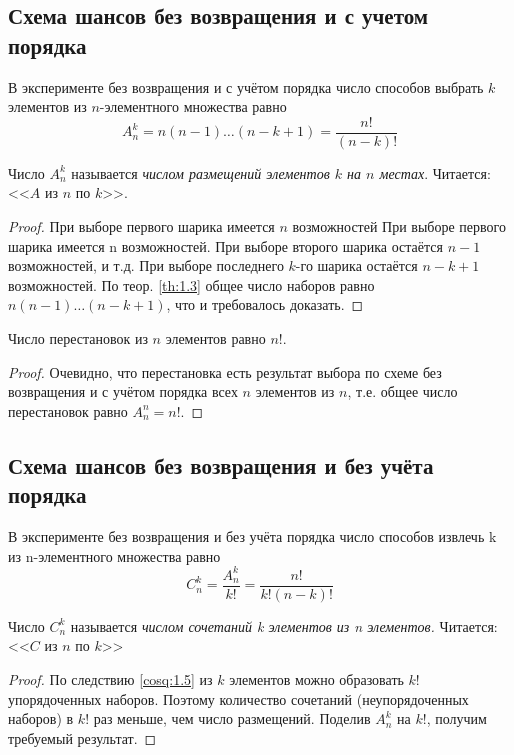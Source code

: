 \subsection{Схема шансов без возвращения и с учетом порядка}
\begin{theorem}
\label{th:1.4}
В эксперименте без возвращения и с учётом порядка число способов выбрать $k$ элементов из $n$-элементного множества равно
\begin{equation*}
	A_n^k=n(n-1)\dots(n-k+1)=\frac{n!}{(n-k)!}
\end{equation*}
\end{theorem}
Число $A_n^k$ называется \textit{числом размещений элементов $k$ на $n$ местах}. Читается: <<$A$ из $n$ по $k$>>.  

\begin{proof}
При выборе первого шарика имеется $n$ возможностей При выборе первого шарика имеется n возможностей. При выборе второго шарика остаётся $n−1$ возможностей, и т.д. При выборе последнего $k$-го шарика остаётся $n − k + 1$ возможностей. По теор. \ref{th:1.3} общее
число наборов равно $n(n−1)\dots(n−k +1)$, что и требовалось доказать.
\end{proof}

\begin{consq}
\label{cosq:1.5}
Число перестановок из $n$ элементов равно $n!$.
\end{consq}

\begin{proof}
Очевидно, что перестановка есть результат выбора по схеме без возвращения и с учётом порядка всех $n$ элементов из $n$, т.е. общее
число перестановок равно $A_n^n=n!$.
\end{proof}
\subsection{Схема шансов без возвращения и без учёта порядка}
\begin{theorem}
\label{th:1.6}
В эксперименте без возвращения и без учёта порядка число
способов извлечь k из n-элементного множества равно
\begin{equation*}
	C_n^k=\frac{A_n^k}{k!}=\frac{n!}{k!(n-k)!}
\end{equation*}
	
Число $C_n^k$ называется \textit{числом сочетаний k элементов из n элементов.}
Читается: <<$C$ из $n$ по $k$>>
\end{theorem}

\begin{proof}
По следствию \ref{cosq:1.5} из $k$ элементов можно образовать $k!$ упорядоченных наборов. Поэтому количество сочетаний 
(неупорядоченных наборов)
в $k!$ раз меньше, чем число размещений. Поделив $A^k_n$ на $k!$, получим требуемый результат.
\end{proof}

